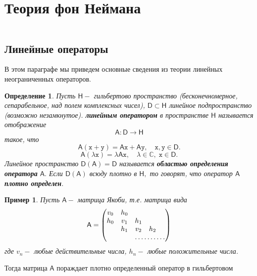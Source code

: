 \documentclass[12pt,a4paper]{article}
\theoremstyle{plain}   \newtheorem{Pro}{Задача}
\newtheorem{Def}{Определение}
\newtheorem{Exa}{Пример}
\begin{document}
\section{Теория фон Неймана}
$ \; $
\\
$ \; $
\\
\subsection{Линейные операторы}
$ \; $
\\
В этом параграфе мы приведем основные сведения из теории
линейных неограниченных операторов.
\begin{Def}
Пусть
$ \mathsf{H} - $
гильбертово пространство (бесконечномерное, сепарабельное,
над полем комплексных чисел),
$ \mathsf{D} \subset \mathsf{H} $
линейное подпространство (возможно незамкнутое).
{\bfseries линейным оператором}
в пространстве
$ \mathsf{H} $
называется отображение
$$
  \mathsf{A} : \mathsf{D} \longrightarrow \mathsf{H}
$$
такое, что
$$
  \mathsf{A}(\mathtt{x}+\mathtt{y})=
  \mathsf{A}\mathtt{x}+\mathsf{A}\mathtt{y},
  \quad \mathtt{x},\mathtt{y} \in \mathsf{D} .
$$
$$
  \mathsf{A}(\lambda \mathtt{x})=\lambda \mathsf{A}\mathtt{x},
  \quad \lambda \in \mathbb{C}, \; \mathtt{x} \in \mathsf{D}.
$$
Линейное пространство
$ \mathsf{D}(\mathsf{A})=\mathsf{D} $
называется
{\bfseries областью определения оператора}
$ \mathsf{A} . $
Если
$ \mathsf{D}(\mathsf{A}) $
всюду плотно в
$ \mathsf{H} , $
то говорят, что оператор
$ \mathsf{A} $
{\bfseries плотно определен}.
\end{Def}
\begin{Exa}
Пусть
$ \mathsf{A} - $
матрица Якоби, т.е. матрица вида
$$
  \mathsf{A}=
    \begin{pmatrix}
	  v_0 & h_0 & \; & \; & \; \\
	  h_0 & v_1 & h_1 & \; & \; \\
	  \; & h_1 & v_2 & h_2 & \; \\
	  \; & \; & \hdotsfor{3}
	\end{pmatrix}
$$
где
$ v_n - $
любые действительные числа,
$ h_n - $
любые положительные числа.
\end{Exa}
Тогда матрица
$ \mathsf{A} $
пораждает плотно определенный оператор в гильбертовом
\end{document}
